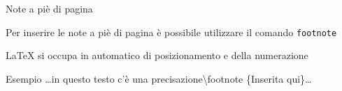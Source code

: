 \begin{frame}{Note a piè di pagina}

Per inserire le note a piè di pagina è possibile utilizzare il comando 
\texttt{footnote}

\vfill

\LaTeX{} si occupa in automatico di posizionamento e della numerazione

\vfill

\begin{exampleblock}{Esempio}
\dots{}in questo testo c'è una precisazione\textbackslash{}footnote%
\{Inserita qui\}\dots{}
\end{exampleblock}

\end{frame}